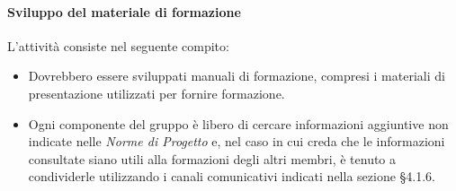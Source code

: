 		\paragraph{Sviluppo del materiale di formazione}
		L'attività consiste nel seguente compito:
		\begin{itemize}
			\item Dovrebbero essere sviluppati manuali di formazione, compresi i materiali di presentazione utilizzati per fornire formazione.
			\item Ogni componente del gruppo è libero di cercare informazioni aggiuntive non indicate nelle \textit{Norme di Progetto} e, nel caso in cui creda che le informazioni consultate siano utili  alla formazioni degli altri membri, è tenuto a condividerle utilizzando i canali comunicativi indicati nella sezione §4.1.6.
		\end{itemize}
		
		
		